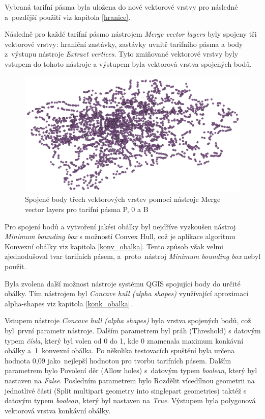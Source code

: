 Vybraná tarifní pásma byla uložena do nové vektorové vrstvy pro následné a~pozdější použití viz kapitola \ref{hranice}.

Následně pro každé tarifní pásmo nástrojem \textit{Merge vector layers} byly spojeny tři vektorové vrstvy: hraniční zastávky, 
zastávky uvnitř tarifního pásma a body z~výstupu nástroje \textit{Extract vertices}.
Tyto zmiňované vektorové vrstvy byly vstupem do tohoto nástroje a výstupem byla 
vektorová vrstva spojených bodů. 

\begin{figure}[H] \centering
    \includegraphics[width=400pt]{./pictures/merged-P0B.png}
    \caption[Spojené body třech vektorových vrstev pomocí nástroje Merge vector layers pro tarifní pásma P, 0 a B]{Spojené body třech vektorových vrstev pomocí nástroje Merge vector layers pro tarifní pásma P, 0 a B}
	\label{fig:merged-P0B}              
\end{figure} 

Pro spojení bodů a vytvoření jakési obálky byl nejdříve vyzkoušen nástroj \textit{Mi\-nimum bounding box} s možností Convex Hull,
což je aplikace algoritmu Konvexní obálky viz kapitola \ref{konv_obalka}. Tento způsob však velmi zjednodušoval tvar
tarifních pásem, a~proto~nástroj \textit{Minimum bounding box} nebyl použit.

Byla zvolena další možnost nástroje systému QGIS spojující body do určité obálky. Tím nástrojem byl \textit{Concave hull (alpha shapes)} 
využívající aproximaci alpha-shapes viz kapitola \ref{konk_obalka}.

Vstupem nástroje \textit{Concave hull (alpha shapes)} byla vrstva spojených bodů, což byl~první parametr
nástroje. Dalším parametrem byl práh (Threshold) s datovým typem \textit{čísla}, který byl volen od 0 do 1,
kde 0 znamenala maximum konkávní obálky a~1~konvexní obálka. Po několika testovacích spuštění byla 
určena hodnota 0,09 jako~nej\-lepší hodnotou pro tvorbu tarifních pásem. Dalším parametrem bylo Povolení děr (Allow holes) 
s~datovým typem \textit{boolean}, který byl nastaven na \textit{False}.
Posledním parametrem bylo Rozdělit vícedílnou geometrii na jednotlivé části (Split multipart geometry 
into singlepart geometries) taktéž s datovým typem \textit{boolean}, který byl nastaven na \textit{True}.  
Výstupem byla polygonová vektorová vrstva konkávní obálky. 

